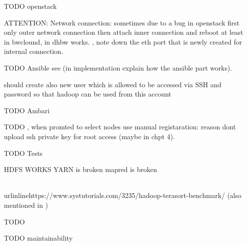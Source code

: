 TODO openstack

    ATTENTION: Network connection: sometimes due to a bug in openstack first only outer network connection then attach inner connection and reboot at least in bwclound, in dhbw works. 
    , note down the eth port that is newly created for internal connection.
    


TODO Ansible
see 
     (in implementation explain how the ansible part works). 
     
     should create also new user which is allowed to be accessed via SSH and  password so that hadoop can be used from this account

TODO Ambari

    TODO ,  when promted to select nodes use manual registaration: reason dont upload ssh private key for root access (maybe in chpt 4).

TODO Tests

HDFS WORKS
YARN is broken
mapred is broken



\\urlinline{https://www.systutorials.com/3235/hadoop-terasort-benchmark/} (also mentioned in \autocite[][]{white2015hadoop})



TODO

TODO maintainability
